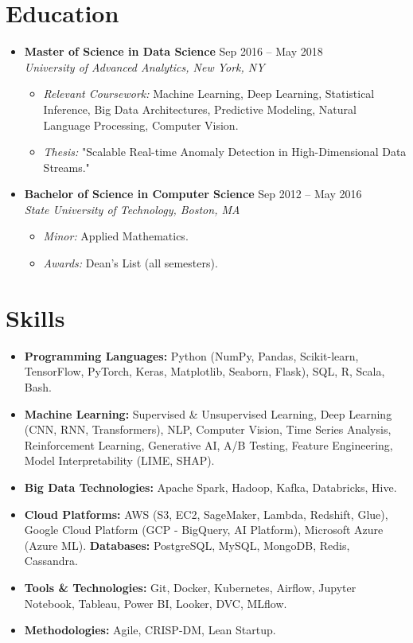 \documentclass[10pt]{article} %
\newenvironment{resumelist}{
    \begin{itemize}[label=\textbullet, leftmargin=1em, noitemsep, topsep=2pt, parsep=0pt, partopsep=0pt]
}{
    \end{itemize}
}
\begin{document}

\section*{Education}
\begin{itemize}[leftmargin=*, label={}]
    \item \textbf{Master of Science in Data Science} \hfill Sep 2016 -- May 2018 \\
    \textit{University of Advanced Analytics, New York, NY}
    \begin{resumelist}
        \item \textit{Relevant Coursework:} Machine Learning, Deep Learning, Statistical Inference, Big Data Architectures, Predictive Modeling, Natural Language Processing, Computer Vision.
        \item \textit{Thesis:} "Scalable Real-time Anomaly Detection in High-Dimensional Data Streams."
    \end{resumelist}
    \vspace{4pt}

    \item \textbf{Bachelor of Science in Computer Science} \hfill Sep 2012 -- May 2016 \\
    \textit{State University of Technology, Boston, MA}
    \begin{resumelist}
        \item \textit{Minor:} Applied Mathematics.
        \item \textit{Awards:} Dean's List (all semesters).
    \end{resumelist}
\end{itemize}


\section*{Skills}
\begin{resumelist}
    \item \textbf{Programming Languages:} Python (NumPy, Pandas, Scikit-learn, TensorFlow, PyTorch, Keras, Matplotlib, Seaborn, Flask), SQL, R, Scala, Bash.
    \item \textbf{Machine Learning:} Supervised & Unsupervised Learning, Deep Learning (CNN, RNN, Transformers), NLP, Computer Vision, Time Series Analysis, Reinforcement Learning, Generative AI, A/B Testing, Feature Engineering, Model Interpretability (LIME, SHAP).
    \item \textbf{Big Data Technologies:} Apache Spark, Hadoop, Kafka, Databricks, Hive.
    \item \textbf{Cloud Platforms:} AWS (S3, EC2, SageMaker, Lambda, Redshift, Glue), Google Cloud Platform (GCP - BigQuery, AI Platform), Microsoft Azure (Azure ML).
    \textbf{Databases:} PostgreSQL, MySQL, MongoDB, Redis, Cassandra.
    \item \textbf{Tools & Technologies:} Git, Docker, Kubernetes, Airflow, Jupyter Notebook, Tableau, Power BI, Looker, DVC, MLflow.
    \item \textbf{Methodologies:} Agile, CRISP-DM, Lean Startup.
\end{resumelist}
\end{document}

